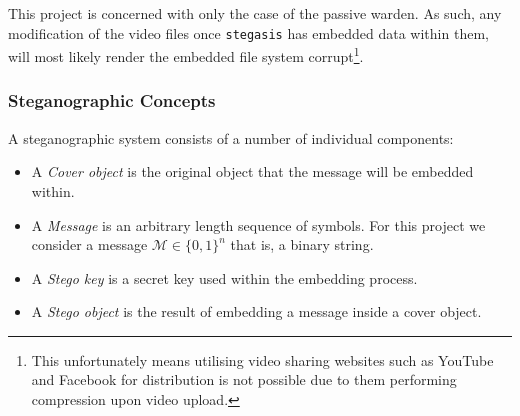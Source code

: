\documentclass[paper=a4, fontsize=11pt,twoside]{scrartcl}
\numberwithin{table}{section}
\numberwithin{figure}{section}
\numberwithin{algorithm}{section}
\begin{document}
This project is concerned with only the case of the passive warden. As such, any modification of the video files once \texttt{stegasis} has embedded data within them, will most likely render the embedded file system corrupt\footnote{This unfortunately means utilising video sharing websites such as YouTube and Facebook for distribution is not possible due to them performing compression upon video upload.}.


\subsubsection{Steganographic Concepts}
A steganographic system consists of a number of individual components:
\begin{itemize}
	\item A \textit{Cover object} is the original object that the message will be embedded within.
	\item A \textit{Message} is an arbitrary length sequence of symbols. For this project we consider a message $\mathcal{M} \in \{0,1\}^{n} $ that is, a binary string.
	\item A \textit{Stego key} is a secret key used within the embedding process.
	\item A \textit{Stego object} is the result of embedding a message inside a cover object.
\end{itemize}
\end{document}
